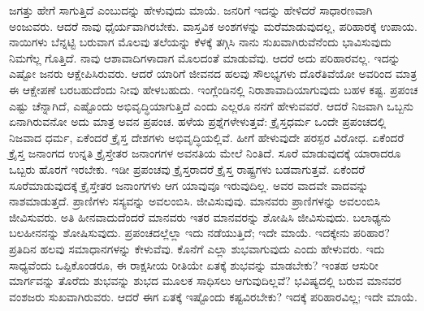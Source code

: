 \eject

ಜಗತ್ತು ಹೇಗೆ ಸಾಗುತ್ತಿದೆ ಎಂಬುದನ್ನು ಹೇಳುವುದು ಮಾಯೆ. ಜನರಿಗೆ ಇದನ್ನು ಹೇಳಿದರೆ ಸಾಧಾರಣವಾಗಿ ಅಂಜುವರು. ಆದರೆ ನಾವು ಧೈರ್ಯವಾಗಿರಬೇಕು. ವಾಸ್ತವಿಕ ಅಂಶಗಳನ್ನು ಮರೆಮಾಡುವುದಲ್ಲ, ಪರಿಹಾರಕ್ಕೆ ಉಪಾಯ. ನಾಯಿಗಳು ಬೆನ್ನಟ್ಟಿ ಬರುವಾಗ ಮೊಲವು ತಲೆಯನ್ನು ಕೆಳಕ್ಕೆ ತಗ್ಗಿಸಿ ನಾನು ಸುಖವಾಗಿರುವೆನೆಂದು ಭಾವಿಸುವುದು ನಿಮಗೆಲ್ಲ ಗೊತ್ತಿದೆ. ನಾವು ಆಶಾವಾದಿಗಳಾದಾಗ ಮೊಲದಂತೆ ಮಾಡುವೆವು. ಆದರೆ ಅದು ಪರಿಹಾರವಲ್ಲ. ಇದನ್ನು ಎಷ್ಟೋ ಜನರು ಆಕ್ಷೇಪಿಸಿರುವರು. ಆದರೆ ಯಾರಿಗೆ ಜೀವನದ ಹಲವು ಸೌಲಭ್ಯಗಳು ದೊರೆತಿವೆಯೋ ಅವರಿಂದ ಮಾತ್ರ ಈ ಆಕ್ಷೇಪಣೆ ಬರಬಹುದೆಂದು ನೀವು ಹೇಳಬಹುದು. ಇಂಗ್ಲೆಂಡಿನಲ್ಲಿ ನಿರಾಶಾವಾದಿಯಾಗುವುದು ಬಹಳ ಕಷ್ಟ. ಪ್ರಪಂಚ ಎಷ್ಟು ಚೆನ್ನಾಗಿದೆ, ಎಷ್ಟೊಂದು ಅಭಿವೃದ್ಧಿಯಾಗುತ್ತಿದೆ ಎಂದು ಎಲ್ಲರೂ ನನಗೆ ಹೇಳುವವರೆ. ಆದರೆ ನಿಜವಾಗಿ ಒಬ್ಬನು ಏನಾಗಿರುವನೋ ಅದು ಮಾತ್ರ ಅವನ ಪ್ರಪಂಚ. ಹಳೆಯ ಪ್ರಶ್ನೆಗಳೇಳುತ್ತವೆ: ಕ್ರೈಸ್ತಧರ್ಮ ಒಂದೇ ಪ್ರಪಂಚದಲ್ಲಿ ನಿಜವಾದ ಧರ್ಮ, ಏಕೆಂದರೆ ಕ್ರೈಸ್ತ ದೇಶಗಳು ಅಭಿವೃದ್ಧಿಯಲ್ಲಿವೆ. ಹೀಗೆ ಹೇಳುವುದೇ ಪರಸ್ಪರ ವಿರೋಧ. ಏಕೆಂದರೆ ಕ್ರೈಸ್ತ ಜನಾಂಗದ ಉನ್ನತಿ ಕ್ರೈಸ್ತೇತರ ಜನಾಂಗಗಳ ಅವನತಿಯ ಮೇಲೆ ನಿಂತಿದೆ. ಸೂರೆ ಮಾಡುವುದಕ್ಕೆ ಯಾರಾದರೂ ಒಬ್ಬರು ಹೊರಗೆ ಇರಬೇಕು. ಇಡೀ ಪ್ರಪಂಚವು ಕ್ರೈಸ್ತರಾದರೆ ಕ್ರೈಸ್ತ ರಾಷ್ಟ್ರಗಳು ಬಡವಾಗುತ್ತವೆ. ಏಕೆಂದರೆ ಸೂರೆಮಾಡುವುದಕ್ಕೆ ಕ್ರೈಸ್ತೇತರ ಜನಾಂಗಗಳು ಆಗ ಯಾವುವೂ ಇರುವುದಿಲ್ಲ. ಅವರ ವಾದವೇ ವಾದವನ್ನು ನಾಶಮಾಡುತ್ತದೆ. ಪ್ರಾಣಿಗಳು ಸಸ್ಯವನ್ನು ಅವಲಂಬಿಸಿ. ಜೀವಿಸುವುವು. ಮಾನವರು ಪ್ರಾಣಿಗಳನ್ನು ಅವಲಂಬಿಸಿ ಜೀವಿಸುವರು. ಅತಿ ಹೀನವಾದುದೆಂದರೆ ಮಾನವರು ಇತರ ಮಾನವರನ್ನು ಶೋಷಿಸಿ ಜೀವಿಸುವುದು. ಬಲಾಢ್ಯನು ಬಲಹೀನನನ್ನು ಶೋಷಿಸುವುದು. ಪ್ರಪಂಚದಲ್ಲೆಲ್ಲಾ ಇದು ನಡೆಯುತ್ತಿದೆ; ಇದೇ ಮಾಯೆ. ಇದಕ್ಕೇನು ಪರಿಹಾರ? ಪ್ರತಿದಿನ ಹಲವು ಸಮಾಧಾನಗಳನ್ನು ಕೇಳುವೆವು. ಕೊನೆಗೆ ಎಲ್ಲಾ ಶುಭವಾಗುವುದು ಎಂದು ಹೇಳುವರು. ಇದು ಸಾಧ್ಯವೆಂದು ಒಪ್ಪಿಕೊಂಡರೂ, ಈ ರಾಕ್ಷಸೀಯ ರೀತಿಯೇ ಏತಕ್ಕೆ ಶುಭವನ್ನು ಮಾಡಬೇಕು? ಇಂತಹ ಆಸುರೀ ಮಾರ್ಗವನ್ನು ತೊರೆದು ಶುಭವನ್ನು ಶುಭದ ಮೂಲಕ ಸಾಧಿಸಲು ಆಗುವುದಿಲ್ಲವೆ? ಭವಿಷ್ಯದಲ್ಲಿ ಬರುವ ಮಾನವರ ವಂಶಜರು ಸುಖವಾಗಿರುವರು. ಆದರೆ ಈಗ ಏತಕ್ಕೆ ಇಷ್ಟೊಂದು ಕಷ್ಟವಿರಬೇಕು? ಇದಕ್ಕೆ ಪರಿಹಾರವಿಲ್ಲ; ಇದೇ ಮಾಯೆ.

